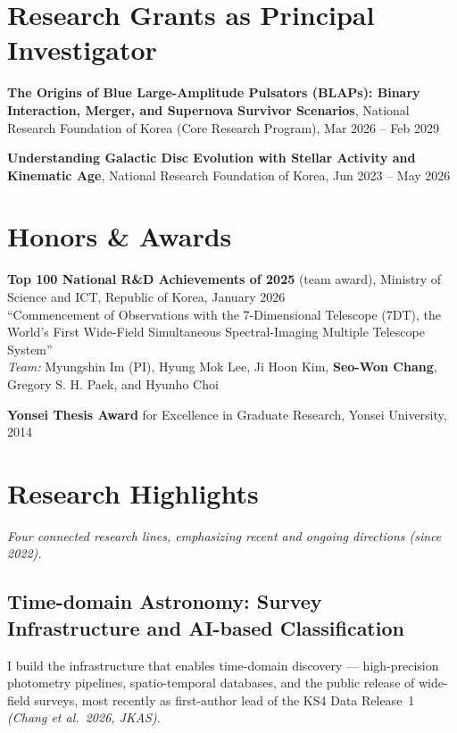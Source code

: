 \documentclass[letterpaper,11pt]{article}
\renewenvironment{itemize}{
  \begin{list}{}{
    \setlength{\leftmargin}{1.5em}
    \setlength{\itemsep}{0.2em}
    \setlength{\parsep}{0em}
  }
}{
  \end{list}
}
\begin{document}
\section*{Research Grants as Principal Investigator}
\begin{itemize}
\item \textbf{The Origins of Blue Large-Amplitude Pulsators (BLAPs): Binary Interaction,
      Merger, and Supernova Survivor Scenarios}, National Research Foundation of Korea
      (Core Research Program), Mar 2026 -- Feb 2029 
\item \textbf{Understanding Galactic Disc Evolution with Stellar Activity and Kinematic
      Age}, National Research Foundation of Korea, Jun 2023 -- May 2026 
\end{itemize}

\section*{Honors \& Awards}
\begin{itemize}
\item \textbf{Top 100 National R\&D Achievements of 2025} (team award),
      Ministry of Science and ICT, Republic of Korea, January 2026 \\
      ``Commencement of Observations with the 7-Dimensional Telescope (7DT),
      the World's First Wide-Field Simultaneous Spectral-Imaging Multiple
      Telescope System'' \\
      \textit{Team:} Myungshin Im (PI), Hyung Mok Lee, Ji Hoon Kim,
      \textbf{Seo-Won Chang}, Gregory S. H. Paek, and Hyunho Choi
\item \textbf{Yonsei Thesis Award} for Excellence in Graduate Research,
      Yonsei University, 2014
\end{itemize}

\section*{Research Highlights}
\emph{Four connected research lines, emphasizing recent and ongoing directions (since 2022).}

\subsection*{Time-domain Astronomy: Survey Infrastructure and AI-based Classification}
I build the infrastructure that enables time-domain discovery --- high-precision photometry
pipelines, spatio-temporal databases, and the public release of wide-field surveys, most
recently as first-author lead of the KS4 Data Release~1 \emph{(Chang et al.\ 2026, JKAS)}.
\end{document}
